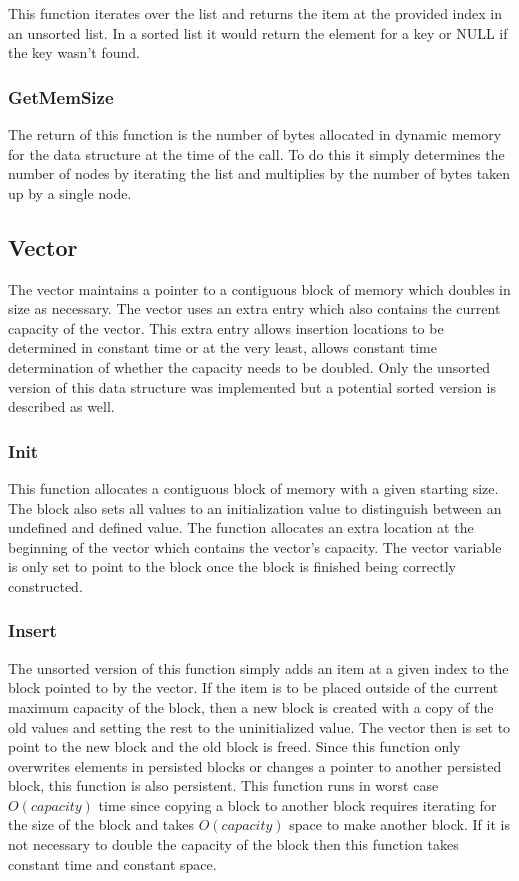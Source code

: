 \documentclass[twocolumn]{article}
\begin{document}
This function iterates over the list and returns the item at the provided index
in an unsorted list. In a sorted list it would return the element for a key or
NULL if the key wasn't found.

\subsubsection{GetMemSize}

The return of this function is the number of bytes allocated in dynamic memory
for the data structure at the time of the call. To do this it simply determines
the number of nodes by iterating the list and multiplies by the number of bytes
taken up by a single node.

\subsection{Vector}

The vector maintains a pointer to a contiguous block of memory which doubles in
size as necessary. The vector uses an extra entry which also contains the
current capacity of the vector. This extra entry allows insertion locations to
be determined in constant time or at the very least, allows constant time
determination of whether the capacity needs to be doubled. Only the unsorted
version of this data structure was implemented but a potential sorted version is
described as well.

\subsubsection{Init}

This function allocates a contiguous block of memory with a given starting size.
The block also sets all values to an initialization value to distinguish between
an undefined and defined value. The function allocates an extra location at the
beginning of the vector which contains the vector's capacity. The vector
variable is only set to point to the block once the block is finished being
correctly constructed.

\subsubsection{Insert}

The unsorted version of this function simply adds an item at a given index to
the block pointed to by the vector. If the item is to be placed outside of the
current maximum capacity of the block, then a new block is created with a copy
of the old values and setting the rest to the uninitialized value. The vector
then is set to point to the new block and the old block is freed. Since this
function only overwrites elements in persisted blocks or changes a pointer to
another persisted block, this function is also persistent. This function runs in
worst case $O(capacity)$ time since copying a block to another block requires
iterating for the size of the block and takes $O(capacity)$ space to make another
block. If it is not necessary to double the capacity of the block then this
function takes constant time and constant space.
\end{document}
